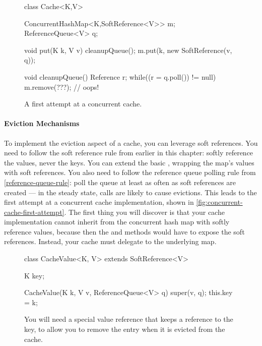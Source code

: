 \begin{wrapfigure}{r}{0.61\textwidth}
\centering
\begin{figurelisting}
class Cache<K,V> {
  ConcurrentHashMap<K,SoftReference<V>> m;
  ReferenceQueue<V> q;
   
  void put(K k, V v) {
    cleanupQueue();
    m.put(k, new SoftReference(v, q));
  }
  
  void cleanupQueue() {
    Reference r;
    while((r = q.poll()) != null)
       m.remove(???); // oops!
  }
}
\end{figurelisting}
\caption{A first attempt at a concurrent cache.}
\label{fig:concurrent-cache-first-attempt}
\end{wrapfigure}

\paragraph{Eviction Mechanisms}
To implement the eviction aspect of a cache, you can leverage soft references.
You need to follow the soft reference rule from earlier in this chapter: softly
reference the values, never the keys. You can extend the basic
, wrapping the map's values with soft references. You
also need to follow the reference queue polling rule from
\autoref{reference-queue-rule}: poll the queue at least as often as soft
references are created --- in the steady state,  calls are likely to
cause evictions. This leads to the first attempt at a concurrent cache
implementation, shown in \autoref{fig:concurrent-cache-first-attempt}. The first
thing you will discover is that your cache implementation cannot inherit from
the concurrent hash map with softly reference values, because then the
 and  methods would have to expose the soft references.
Instead, your cache must delegate to the underlying map. 

\begin{wrapfigure}{l}{0.43\textwidth}
\centering
\begin{framedlisting}
class CacheValue<K, V> extends SoftReference<V> {
  K key;
   
  CacheValue(K k, V v, ReferenceQueue<V> q) {
    super(v, q);
    this.key = k;
  }
}
\end{framedlisting}
\caption{You will need a special value reference that keeps a reference to the
key, to allow you to remove the entry when it is evicted from the cache.}
\end{wrapfigure}

